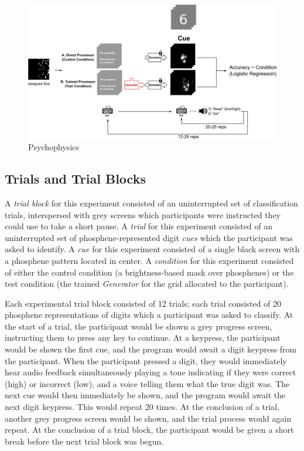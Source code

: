 \documentclass[a4paper,11pt,openany]{book}
\begin{document}
\begin{figure}
\begin{center}
\includegraphics[width=.9\linewidth]{./images/method_psychophysics.png}
\end{center}
\caption{\label{orgb989c69}
Psychophysics}
\end{figure}


\subsection*{Trials and Trial Blocks}
\label{sec:org0bbf856}

A \emph{trial block} for this experiment consisted of an uninterrupted set of classification trials, interspersed with grey screens which participants were instructed they could use to take a short pause.
A \emph{trial} for this experiment consisted of an uninterrupted set of phosphene-represented digit \emph{cues} which the participant was asked to identify.
A \emph{cue} for this experiment consisted of a single black screen with a phosphene pattern located in center.
A \emph{condition} for this experiment consisted of either the control condition (a brightness-based mask over phosphenes) or the test condition (the trained \emph{Generator} for the grid allocated to the participant).

Each experimental trial block consisted of 12 trials; each trial consisted of 20 phosphene representations of digits which a participant was asked to classify.
At the start of a trial, the participant would be shown a grey progress screen, instructing them to press any key to continue.
At a keypress, the participant would be shown the first cue, and the program would await a digit keypress from the participant.
When the participant pressed a digit, they would immediately hear audio feedback simultaneously playing a tone indicating if they were correct (high) or incorrect (low), and a voice telling them what the true digit was.
The next cue would then immediately be shown, and the program would await the next digit keypress.
This would repeat 20 times.
At the conclusion of a trial, another grey progress screen would be shown, and the trial process would again repeat.
At the conclusion of a trial block, the participant would be given a short break before the next trial block was begun.
\end{document}
